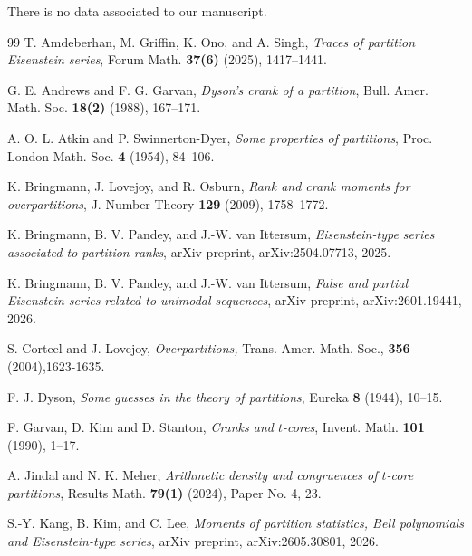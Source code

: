 \documentclass[12pt,oneside,reqno]{amsart}
\numberwithin{equation}{section}
\begin{document}
	 There is no data associated to our manuscript.
	
	
	
	
	\begin{thebibliography}{99}
     T. Amdeberhan, M. Griffin, K. Ono, and A. Singh,
     \emph{Traces of partition Eisenstein series},
      Forum Math. \textbf{37(6)} (2025), 1417--1441.
      
	G. E. Andrews and F. G. Garvan, \emph{Dyson's crank of a partition}, Bull. Amer. Math. Soc. \textbf{18(2)} (1988), 167--171.
	
	A. O. L. Atkin and P. Swinnerton-Dyer, \emph{Some properties of partitions},
	Proc. London Math. Soc. \textbf{4} (1954), 84--106.
	
	K. Bringmann, J. Lovejoy, and R. Osburn,
	\emph{Rank and crank moments for overpartitions},
	J. Number Theory \textbf{129} (2009), 1758--1772.
	
	K. Bringmann, B. V. Pandey, and J.-W. van Ittersum,
	\emph{Eisenstein-type series associated to partition ranks},
	arXiv preprint, arXiv:2504.07713, 2025.
	
	K. Bringmann, B. V. Pandey, and J.-W. van Ittersum,
	\emph{False and partial Eisenstein series related to unimodal sequences},
	arXiv preprint, arXiv:2601.19441, 2026.
	
	 S. Corteel and J. Lovejoy, \emph{Overpartitions, } Trans. Amer. Math. Soc., \textbf{356} (2004),1623-1635.
	
	 F. J. Dyson, \emph{Some guesses in the theory of partitions}, Eureka \textbf{8} (1944), 10--15.
	
	F. Garvan, D. Kim and D. Stanton, \emph{Cranks and $t$-cores},
	Invent. Math. \textbf{101} (1990), 1--17.
	
	A. Jindal and N. K. Meher, \emph{Arithmetic density and congruences of $t$-core partitions},
	Results Math. \textbf{79(1)} (2024), Paper No. 4, 23.
	
	S.-Y. Kang, B. Kim, and C. Lee,
	\emph{Moments of partition statistics, Bell polynomials and Eisenstein-type series},
	arXiv preprint, arXiv:2605.30801, 2026.
	

\end{thebibliography}
\end{document}
